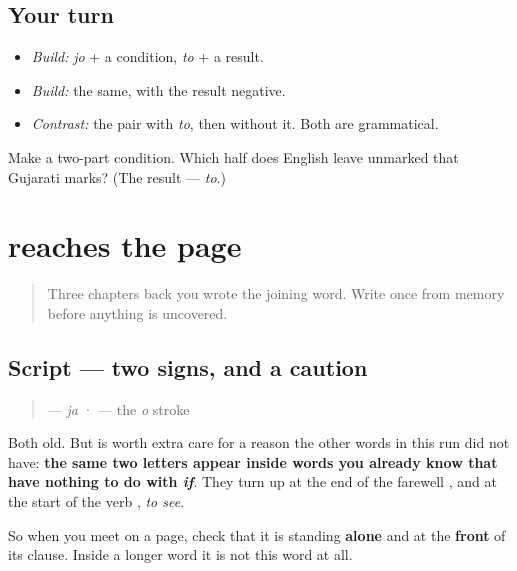 \subsection*{Your turn}
\begin{itemize}
\raggedright
  \item \emph{Build:} \emph{jo} + a condition, \emph{to} + a result.
  \item \emph{Build:} the same, with the result negative.
  \item \emph{Contrast:} the pair with \emph{to}, then without it. Both are grammatical.
\end{itemize}

\begin{tcolorbox}[breakable,colback=teal!4,colframe=teal!35!black,title={Before you move on}]
Make a two-part condition. Which half does English leave unmarked that Gujarati marks? (The result — \emph{to}.)
\end{tcolorbox}
\section[\texorpdfstring{\gu{જો} (jo)}{જો (jo)}]{ reaches the page}

\label{lesson:GU-C35-jo-write}



\begin{quote}
Three chapters back you wrote the joining word. Write \textbf{} once from memory before anything is uncovered.
\end{quote}

\subsection*{Script — two signs, and a caution}
\begin{quote}
\textbf{} — \emph{ja} · \textbf{} — the \emph{o} stroke
\end{quote}

Both old. But \textbf{} is worth extra care for a reason the other words in this run did not have: \textbf{the same two letters appear inside words you already know that have nothing to do with \emph{if}}. They turn up at the end of the farewell \textbf{}, and at the start of the verb \textbf{}, \emph{to see}.

So when you meet \textbf{} on a page, check that it is standing \textbf{alone} and at the \textbf{front} of its clause. Inside a longer word it is not this word at all.

